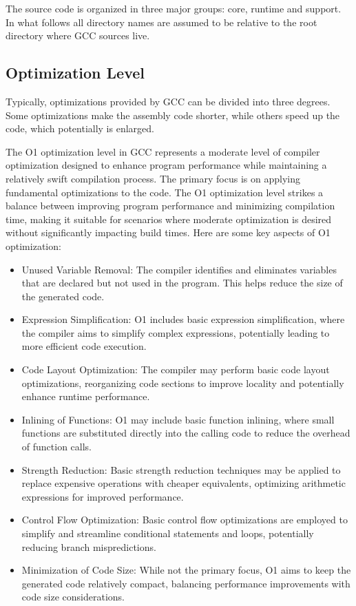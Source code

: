 \documentclass[conference]{IEEEtran}
\begin{document}
The source code is organized in three major groups: core, runtime and support. In what follows all directory names are assumed to be relative to the root directory where GCC sources live.\cite{b1}

\subsection{Optimization Level}
Typically, optimizations provided by GCC can be divided into three degrees. Some optimizations make the assembly code shorter, while others speed up the code, which potentially is enlarged.

The O1 optimization level in GCC represents a moderate level of compiler optimization designed to enhance program performance while maintaining a relatively swift compilation process. The primary focus is on applying fundamental optimizations to the code. The O1 optimization level strikes a balance between improving program performance and minimizing compilation time, making it suitable for scenarios where moderate optimization is desired without significantly impacting build times. Here are some key aspects of O1 optimization:
\begin{itemize}
	\item Unused Variable Removal:
The compiler identifies and eliminates variables that are declared but not used in the program. This helps reduce the size of the generated code.
	\item Expression Simplification:
O1 includes basic expression simplification, where the compiler aims to simplify complex expressions, potentially leading to more efficient code execution.
	\item Code Layout Optimization:
The compiler may perform basic code layout optimizations, reorganizing code sections to improve locality and potentially enhance runtime performance.
	\item Inlining of Functions:
O1 may include basic function inlining, where small functions are substituted directly into the calling code to reduce the overhead of function calls.
	\item Strength Reduction:
Basic strength reduction techniques may be applied to replace expensive operations with cheaper equivalents, optimizing arithmetic expressions for improved performance.
	\item Control Flow Optimization:
Basic control flow optimizations are employed to simplify and streamline conditional statements and loops, potentially reducing branch mispredictions.
	\item Minimization of Code Size:
While not the primary focus, O1 aims to keep the generated code relatively compact, balancing performance improvements with code size considerations.
\end{itemize}
\end{document}

